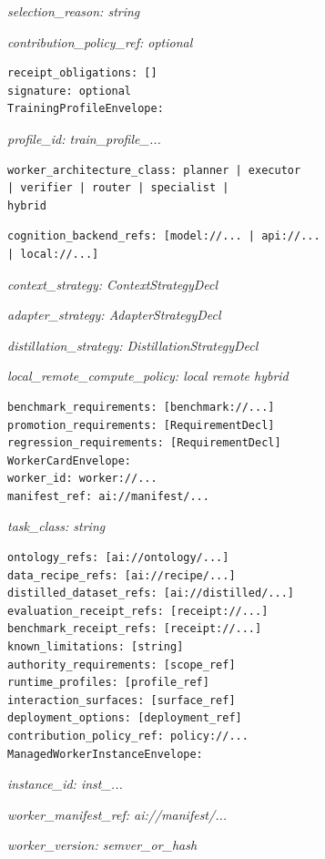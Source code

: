 \documentclass[
  11pt,
]{article}
\begin{document}
\emph{selection\_reason: string}

\emph{contribution\_policy\_ref: optional}

\begin{lstlisting}[language=rustioi]
receipt_obligations: []
signature: optional
TrainingProfileEnvelope:
\end{lstlisting}
\emph{profile\_id: train\_profile\_...}

\begin{lstlisting}[language={},basicstyle=\ttfamily\scriptsize]
worker_architecture_class: planner | executor
| verifier | router | specialist |
hybrid
\end{lstlisting}

\begin{lstlisting}[language={},basicstyle=\ttfamily\scriptsize]
cognition_backend_refs: [model://... | api://...
| local://...]
\end{lstlisting}
\emph{context\_strategy: ContextStrategyDecl}

\emph{adapter\_strategy: AdapterStrategyDecl}

\emph{distillation\_strategy: DistillationStrategyDecl}

\emph{local\_remote\_compute\_policy: local \textbar{} remote \textbar{}
hybrid}

\begin{lstlisting}[language={},basicstyle=\ttfamily\scriptsize]
benchmark_requirements: [benchmark://...]
promotion_requirements: [RequirementDecl]
regression_requirements: [RequirementDecl]
WorkerCardEnvelope:
worker_id: worker://...
manifest_ref: ai://manifest/...
\end{lstlisting}
\emph{task\_class: string}

\begin{lstlisting}[language={},basicstyle=\ttfamily\scriptsize]
ontology_refs: [ai://ontology/...]
data_recipe_refs: [ai://recipe/...]
distilled_dataset_refs: [ai://distilled/...]
evaluation_receipt_refs: [receipt://...]
benchmark_receipt_refs: [receipt://...]
known_limitations: [string]
authority_requirements: [scope_ref]
runtime_profiles: [profile_ref]
interaction_surfaces: [surface_ref]
deployment_options: [deployment_ref]
contribution_policy_ref: policy://...
ManagedWorkerInstanceEnvelope:
\end{lstlisting}
\emph{instance\_id: inst\_...}

\emph{worker\_manifest\_ref: ai://manifest/...}

\emph{worker\_version: semver\_or\_hash}
\end{document}
